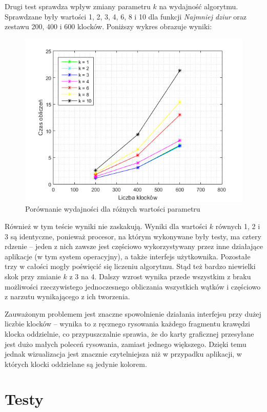 \documentclass{article}
\begin{document}
Drugi test sprawdza wpływ zmiany parametru $k$ na wydajność algorytmu. Sprawdzane były wartości 1, 2, 3, 4, 6, 8 i 10 dla funkcji \textit{Najmniej dziur} oraz zestawu 200, 400 i 600 klocków. Poniższy wykres obrazuje wyniki:
\begin{figure}[H]
\includegraphics[width=\textwidth]{porownanie_k.png}
\caption{Porównanie wydajności dla różnych wartości parametru}
\end{figure}
Również w tym teście wyniki nie zaskakują. Wyniki dla wartości $k$ równych 1, 2 i 3 są identyczne, ponieważ procesor, na którym wykonywane były testy, ma cztery rdzenie -- jeden z nich zawsze jest częściowo wykorzystywany przez inne działające aplikacje (w tym system operacyjny), a także interfejs użytkownika. Pozostałe trzy w całości mogły poświęcić się liczeniu algorytmu. Stąd też bardzo niewielki skok przy zmianie $k$ z 3 na 4. Dalszy wzrost wynika przede wszystkim z braku możliwości rzeczywistego jednoczesnego obliczania wszystkich wątków i częściowo z narzutu wynikającego z ich tworzenia.

Zauważonym problemem jest znaczne spowolnienie działania interfejsu przy dużej liczbie klocków -- wynika to z ręcznego rysowania każdego fragmentu krawędzi klocka oddzielnie, co przypuszczalnie sprawia, że do karty graficznej przesyłane jest dużo małych poleceń rysowania, zamiast jednego większego. Dzięki temu jednak wizualizacja jest znacznie czytelniejsza niż w przypadku aplikacji, w których klocki oddzielane są jedynie kolorem. 
\clearpage
\section{Testy}
\end{document}
